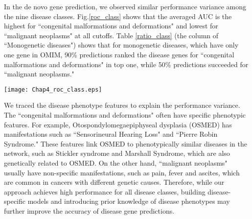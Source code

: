 In the de novo gene prediction, we observed similar performance variance
among the nine disease classes. Fig.\ref{roc_class} shows that
the averaged AUC is the highest for ``congenital malformations
and deformations" and lowest for ``malignant neoplasms"
at all cutoffs. Table \ref{ratio_class} (the column of ``Monogenetic diseases")
shows that for monogenetic diseases, which have only one gene in OMIM,
90\% predictions ranked the disease genes for ``congenital malformations
and deformations" in top one, while 50\% predictions succeeded for ``malignant neoplasms."
\begin{figure*}[!t]
\centering
\vspace{-.5cm}
\texttt{[image: Chap4\_roc\_class.eps]}
\vspace{-.5cm}
\caption{The ROC curves for each disease class in de novo gene prediction. }
\vspace{-.5cm}
\label{roc_class}
\end{figure*}

We traced the disease phenotype features to explain
the performance variance. The ``congenital malformations
and deformations" often have specific phenotypic features.
For example, Otospondylomegaepiphyseal dysplasia (OSMED)
has manifestations such as ``Sensorineural Hearing Loss"
and ``Pierre Robin Syndrome." These features link OSMED
to phenotypically similar diseases in the network,
such as Stickler syndrome and Marshall Syndrome,
which are also genetically related to OSMED.
On the other hand, ``malignant neoplasms" usually have
non-specific manifestations, such as pain, fever and ascites,
which are common in cancers with different genetic causes.
Therefore, while our approach achieves high performance for
all disease classes, building disease-specific models
and introducing prior knowledge of disease phenotypes
may further improve the accuracy of disease gene predictions.

